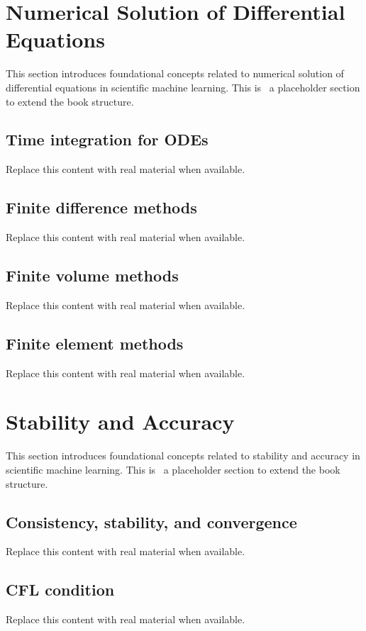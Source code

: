 
\section{Numerical Solution of Differential Equations}
This section introduces foundational concepts related to numerical solution of differential equations in scientific machine learning. This is~\cite{abdulmaksoudTransformerBasedSensorFusion2025} a placeholder section to extend the book structure.

\subsection{Time integration for ODEs}
Replace this content with real material when available.

\subsection{Finite difference methods}
Replace this content with real material when available.

\subsection{Finite volume methods}
Replace this content with real material when available.

\subsection{Finite element methods}
Replace this content with real material when available.

\section{Stability and Accuracy}
This section introduces foundational concepts related to stability and accuracy in scientific machine learning. This is~\cite{abdulmaksoudTransformerBasedSensorFusion2025} a placeholder section to extend the book structure.

\subsection{Consistency, stability, and convergence}
Replace this content with real material when available.

\subsection{CFL condition}
Replace this content with real material when available.

